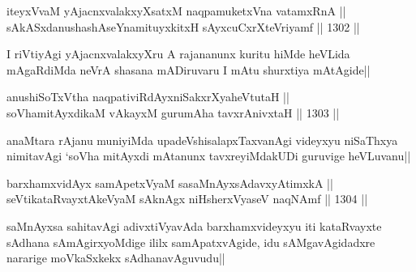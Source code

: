 
\begin{shl}
iteyxVvaM yAjacnxvalakxyXsatxM naqpamuketxVna vatamxRnA || \\
sAkASxdanushashAseYnamituyxkitxH sAyxcuCxrXteVriyamf ||  1302 ||  
\end{shl}

\begin{artha}
I riVtiyAgi yAjacnxvalakxyXru A rajananunx kuritu hiMde heVLida mAgaRdiMda neVrA shasana mADiruvaru I mAtu shurxtiya mAtAgide||
\end{artha}


\begin{shl}
anushiSoTxV\s tha naqpativiRdAyxniSakxrXyaheVtutaH || \\
soV\s hamitAyxdikaM vAkayxM gurumAha tavxrAnivxtaH ||  1303 ||  
\end{shl}

\begin{artha}
anaMtara rAjanu muniyiMda upadeVshisalapxTaxvanAgi videyxyu niSaThxya nimitavAgi `soV\s ha mitAyxdi mAtanunx tavxreyiMdakUDi guruvige heVLuvanu||
\end{artha}


\begin{shl}
barxhamxvidAyx samApetxVyaM sasaMnAyxsA\s davxyAtimxkA || \\
seVtikataRvayxtAkeVyaM sAknAgx niHsherxVyaseV naqNAmf ||  1304 ||  
\end{shl}

\begin{artha}
saMnAyxsa sahitavAgi adivxtiVyavAda barxhamxvideyxyu iti kataRvayxte sAdhana sAmAgirxyoMdige ililx samApatxvAgide, idu sAMgavAgidadxre nararige moVkaSxkekx sAdhanavAguvudu||
\end{artha}
